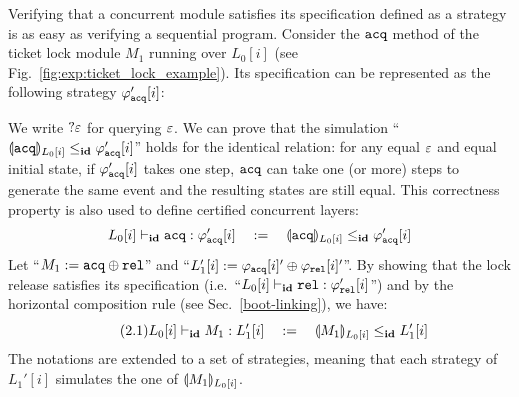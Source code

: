 Verifying that a concurrent module satisfies its specification 
defined as a strategy is as easy as verifying a sequential program.
Consider the ${\mathrm{\texttt{acq}}}$ method of the ticket lock module $M_1$ running 
over $L_0[i]$ (see Fig.~\ref{fig:exp:ticket_lock_example}). 
Its  specification
can be represented as the following strategy $\varphi_{{\mathrm{\texttt{acq}}}}'[i]$:
\begin{center}
\end{center}
We write $?\oracle$ for querying $\oracle$.
We can prove that the simulation ``$\llparenthesis {\mathrm{\texttt{acq}}} \rrparenthesis_{L_0[i]}\le_{\textbf{id}} \varphi_{{\mathrm{\texttt{acq}}}}'[i]$'' holds for the identical relation: for any equal $\oracle$
and equal initial state, if $\varphi_{{\mathrm{\texttt{acq}}}}'[i]$ takes one step, ${\mathrm{\texttt{acq}}}$ can take one (or more) steps to generate the same event and the resulting states are still equal. This correctness property is also used to define certified concurrent layers:
$$L_0[i] \vdash_{\textbf{id}} {\mathrm{\texttt{acq}}} : \varphi_{{\mathrm{\texttt{acq}}}}'[i]
\quad := \quad  \llparenthesis {\mathrm{\texttt{acq}}} \rrparenthesis_{L_0[i]}\le_{\textbf{id}} \varphi_{{\mathrm{\texttt{acq}}}}'[i]$$
Let ``$M_1:= {\mathrm{\texttt{acq}}} \oplus {\mathrm{\texttt{rel}}}$''
and ``$L_1'[i]:= \varphi_{{\mathrm{\texttt{acq}}}}[i]'\oplus \varphi_{{\mathrm{\texttt{rel}}}}[i]'$''. By showing that the lock release    satisfies its specification
(i.e.\, ``$L_0[i] \vdash_{\textbf{id}} {\mathrm{\texttt{rel}}} : \varphi_{{\mathrm{\texttt{rel}}}}'[i]$'')
and by the horizontal composition rule (see Sec.~\ref{boot-linking}), we have:
\begin{equation} \label{eq:acq} \tag{2.1}
L_0[i] \vdash_{\textbf{id}} M_1 : L_1'[i]\quad:=\quad \llparenthesis M_1 \rrparenthesis_{L_0[i]}\le_{\textbf{id}} L_1'[i]
\end{equation}
The notations are extended to a set of strategies,  meaning that each strategy of $L_1'[i]$ simulates the one of $\llparenthesis M_1 \rrparenthesis_{L_0[i]}$. 


